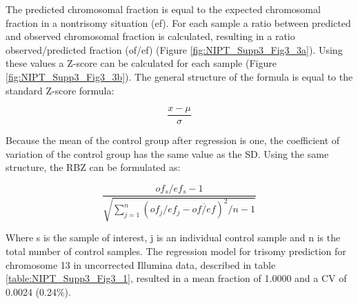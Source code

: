 The predicted chromosomal fraction is equal to the expected chromosomal fraction in a nontrisomy situation (ef). For each sample a ratio between predicted and observed chromosomal fraction is calculated, resulting in a ratio observed/predicted fraction (of/ef) (Figure \ref{fig:NIPT_Supp3_Fig3_3a}).
Using these values a Z-score can be calculated for each sample (Figure \ref{fig:NIPT_Supp3_Fig3_3b}). The general structure of the formula is equal to the standard Z-score formula:

\begin{equation*}
\frac{x - \mu}{\sigma}
\end{equation*}

Because the mean of the control group after regression is one, the coefficient of variation of the control group has the same value as the SD. Using the same structure, the RBZ can be formulated as:

\begin{equation*}
\frac{of_s / ef_s - 1}{\sqrt{\sum^n_{j=1}(of_j / ef_j - \overline{of/ef})^2 / n - 1}}
\end{equation*}

Where s is the sample of interest, j is an individual control sample and n is the total number of control samples. 
The regression model for trisomy prediction for chromosome 13 in uncorrected Illumina data, described in table \ref{table:NIPT_Supp3_Fig3_1}, resulted in a mean fraction of 1.0000 and a CV of 0.0024 (0.24\%).

